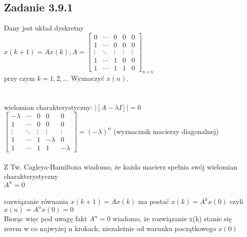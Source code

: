 \subsection*{Zadanie 3.9.1} {\color{darkgray}
	Dany jest układ dyskretny\\
	$x(k+1)=Ax(k), A=\left[ \begin{array}{ccccc}    0&\cdots&0&0&0 \\  1&\cdots&0&0&0 \\\vdots&\ddots&\vdots&\vdots&\vdots \\ 1&\cdots&1&0&0    \\1&\cdots&1&1&0\end{array}\right]_{n \times n}$\\
	przy czym $k=1,2,...$ Wyznaczyć $x(n)$.\\
}\lineh
\\\\
wielomian charakterystyczny: $| [A-\lambda I] |=0$\\
$\left[ \begin{array}{ccccc}    -\lambda&\cdots&0&0&0 \\  1&\cdots&0&0&0 \\\vdots&\ddots&\vdots&\vdots&\vdots \\ 1&\cdots&1&-\lambda&0    \\1&\cdots&1&1&-\lambda\end{array}\right]=(-\lambda)^n${\color{lightgray} (wyznacznik macierzy diagonalnej)}\\\\
Z Tw. Cagleya-Hamiltona wiadomo, że każda macierz spełnia swój wielomian charakterystyczny\\
$A^n=0 $\\\\
rozwiązanie równania $x(k+1)=Ax(k)$ ma postać $x(k)=A^kx(0)$ czyli $x(n)=A^nx(0)=0$\\
Biorąc więc pod uwagę fakt $A^n=0 $ wiadomo, że rozwiązanie x(k) stanie się zerem w co najwyżej n krokach, niezależnie od warunku początkowego $x(0)$

\pagebreak
